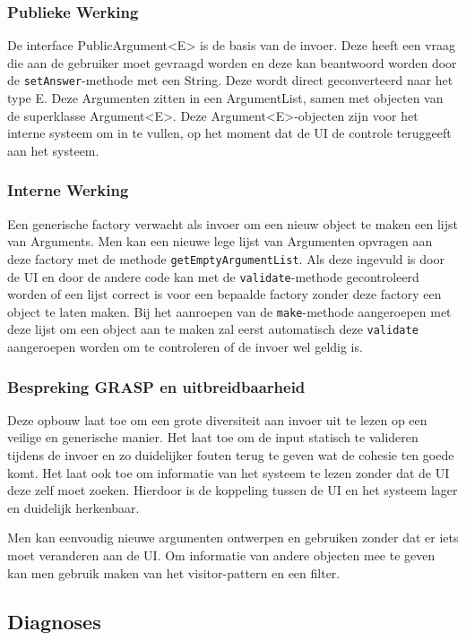 \documentclass[a4paper]{article}
\begin{document}
\subsubsection{Publieke Werking}
De interface PublicArgument<E> is de basis van de invoer. Deze heeft een vraag die aan de gebruiker moet gevraagd worden en deze kan beantwoord worden door de \texttt{setAnswer}-methode met een String. Deze wordt direct geconverteerd naar het type E. Deze Argumenten zitten in een ArgumentList, samen met objecten van de superklasse Argument<E>. Deze Argument<E>-objecten zijn voor het interne systeem om in te vullen, op het moment dat de UI de controle teruggeeft aan het systeem.  

\subsubsection{Interne Werking}
Een generische factory verwacht als invoer om een nieuw object te maken een lijst van Arguments. Men kan een nieuwe lege lijst van Argumenten opvragen aan deze factory met de methode \texttt{getEmptyArgumentList}. Als deze ingevuld is door de UI en door de andere code kan met de \texttt{validate}-methode gecontroleerd worden of een lijst correct is voor een bepaalde factory zonder deze factory een object te laten maken. Bij het aanroepen van de \texttt{make}-methode aangeroepen met deze lijst om een object aan te maken zal eerst automatisch deze \texttt{validate} aangeroepen worden om te controleren of de invoer wel geldig is.

\subsubsection{Bespreking GRASP en uitbreidbaarheid}
Deze opbouw laat toe om een grote diversiteit aan invoer uit te lezen op een veilige en generische manier. Het laat toe om de input statisch te valideren tijdens de invoer en zo duidelijker fouten terug te geven wat de cohesie ten goede komt. Het laat ook toe om informatie van het systeem te lezen zonder dat de UI deze zelf moet zoeken. Hierdoor is de koppeling tussen de UI en het systeem lager en duidelijk herkenbaar. 

Men kan eenvoudig nieuwe argumenten ontwerpen en gebruiken zonder dat er iets moet veranderen aan de UI. Om informatie van andere objecten mee te geven kan men gebruik maken van het visitor-pattern en een filter.

\subsection{Diagnoses \label{sec:diagnosis}}
\end{document}
